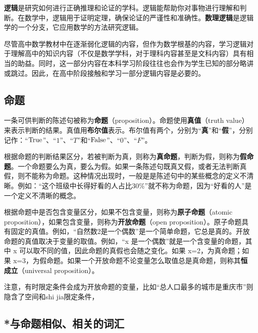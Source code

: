 
\begin{issues}
\issueDraft
\end{issues}

\textbf{逻辑}是研究如何进行正确推理和论证的学科。逻辑能帮助你对事物进行理解和判断。在数学中，逻辑用于证明定理，确保论证的严谨性和准确性。\textbf{数理逻辑}是逻辑学的一个分支，它应用数学的方法研究逻辑。

尽管高中数学教材中在逐渐弱化逻辑的内容，但作为数学根基的内容，学习逻辑对于理解高中的知识内容（不仅是数学学科，对于理科内容甚至是文科内容）具有相当的助益。同时，这一部分内容在本科学习阶段往往也会作为学生已知的部分略讲或跳过。因此，在高中阶段接触和学习一部分逻辑内容是必要的。

\subsection{命题}

一条可供判断的陈述句被称为\textbf{命题}（proposition）。命题使用\textbf{真值}（truth value）来表示判断的结果。真值用\textbf{布尔值}表示。布尔值有两个，分别为“\textbf{真}”和“\textbf{假}”，分别记作：“${\rm True}$”、“$1$”、“$T$”和“${\rm False}$”、“$0$”、“$F$”。

根据命题的判断结果区分，若被判断为真，则称为\textbf{真命题}，判断为假，则称为\textbf{假命题}。一个命题要么为真，要么为假。如果一条陈述句既真又假，或者无法判断真假，则不能称为命题。这种情况出现时，一般是是陈述句中的某些概念的定义不清晰。例如：“这个班级中长得好看的人占比$30\%$”就不称为命题，因为“好看的人”是一个定义不清晰的概念。

根据命题中是否包含变量区分，如果不包含变量，则称为\textbf{原子命题}（atomic proposition），如果包含变量，则称为\textbf{开放命题}（open proposition）。原子命题具有固定的真值。例如，“自然数2是一个偶数”是一个简单命题，它总是真的。开放命题的真值取决于变量的取值。例如，“x 是一个偶数”就是一个含变量的命题，其中 x 可以取不同的值，因此命题的真假也会随之变化。如果 x=2，为真命题；如果 x=3，为假命题。如果一个开放命题不论变量怎么取值总是真命题，则称其\textbf{恒成立}（universal proposition）。

注意，有时限定条件会成为开放命题的变量，比如“总人口最多的城市是重庆市”则隐含了空间和shi jia限定条件，


\subsection{*与命题相似、相关的词汇}

